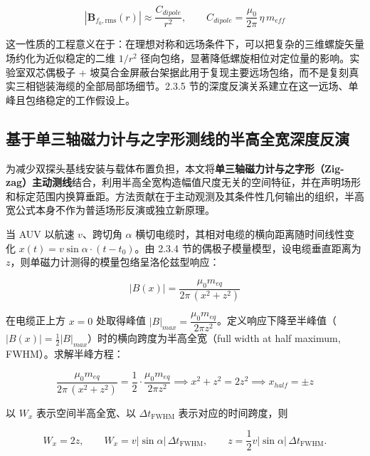 \begin{equation}
|\boldsymbol{B}_{f_0,\mathrm{rms}}(r)| \approx \frac{C_{dipole}}{r^2}, \qquad C_{dipole} = \frac{\mu_0}{2\pi}\,\eta\, m_{eff}
\label{eq:ch02-farfield-envelope}
\end{equation}

这一性质的工程意义在于：在理想对称和远场条件下，可以把复杂的三维螺旋矢量场约化为近似稳定的二维 \(1/r^2\) 径向包络，显著降低螺旋相位对定位量的影响。实验室双芯偶极子 + 坡莫合金屏蔽台架据此用于复现主要远场包络，而不是复刻真实三相铠装海缆的全部局部场细节。2.3.5 节的深度反演关系建立在这一远场、单峰且包络稳定的工作假设上。

\subsection{基于单三轴磁力计与之字形测线的半高全宽深度反演}\label{sec:ch02-2-3-5}

为减少双探头基线安装与载体布置负担，本文将\textbf{单三轴磁力计与之字形（Zig-zag）主动测线}结合，利用半高全宽构造幅值尺度无关的空间特征，并在声明场形和标定范围内换算垂距。方法贡献在于主动观测及其条件性几何输出的组织，半高宽公式本身不作为普适场形反演或独立新原理。

当 AUV 以航速 \(v\)、跨切角 \(\alpha\) 横切电缆时，其相对电缆的横向距离随时间线性变化 \(x(t) = v\sin\alpha \cdot (t - t_0)\)。由 2.3.4 节的偶极子模量模型，设电缆垂直距离为 \(z\)，则单磁力计测得的模量包络呈洛伦兹型响应：

\begin{equation}
|B(x)| = \frac{\mu_0 m_{eq}}{2\pi\,(x^2 + z^2)}
\label{eq:ch02-lorentzian}
\end{equation}

在电缆正上方 \(x = 0\) 处取得峰值 \(|B|_{max} = \dfrac{\mu_0 m_{eq}}{2\pi z^2}\)。定义响应下降至半峰值（\(|B(x)| = \tfrac{1}{2}|B|_{max}\)）时的横向跨度为半高全宽（full width at half maximum, FWHM）。求解半峰方程：

\begin{equation}
\frac{\mu_0 m_{eq}}{2\pi\,(x^2 + z^2)} = \frac{1}{2}\cdot\frac{\mu_0 m_{eq}}{2\pi z^2} \implies x^2 + z^2 = 2z^2 \implies x_{half} = \pm z
\label{eq:ch02-half-max}
\end{equation}

以 \(W_x\) 表示空间半高全宽、以 \(\Delta t_{\mathrm{FWHM}}\) 表示对应的时间跨度，则

\begin{equation}
W_x=2z,\qquad W_x=v|\sin\alpha|\,\Delta t_{\mathrm{FWHM}},\qquad z=\frac{1}{2}v|\sin\alpha|\,\Delta t_{\mathrm{FWHM}}.
\label{eq:ch02-fwhm-depth}
\end{equation}

